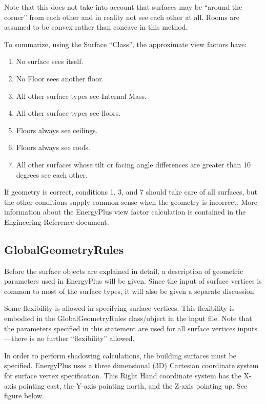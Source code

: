 Note that this does not take into account that surfaces may be ``around the corner'' from each other and in reality not see each other at all. Rooms are assumed to be convex rather than concave in this method.

To summarize, using the Surface ``Class'', the approximate view factors have:

\begin{enumerate}
\item
  No surface sees itself.
\item
  No Floor sees another floor.
\item
  All other surface types see Internal Mass.
\item
  All other surface types see floors.
\item
  Floors always see ceilings.
\item
  Floors always see roofs.
\item
  All other surfaces whose tilt or facing angle differences are greater than 10 degrees see each other.
\end{enumerate}

If geometry is correct, conditions 1, 3, and 7 should take care of all surfaces, but the other conditions supply common sense when the geometry is incorrect. More information about the EnergyPlus view factor calculation is contained in the Engineering Reference document.

\subsection{GlobalGeometryRules}\label{globalgeometryrules}

Before the surface objects are explained in detail, a description of geometric parameters used in EnergyPlus will be given. Since the input of surface vertices is common to most of the surface types, it will also be given a separate discussion.

Some flexibility is allowed in specifying surface vertices. This flexibility is embodied in the GlobalGeometryRules class/object in the input file. Note that the parameters specified in this statement are used for all surface vertices inputs---there is no further ``flexibility'' allowed.

In order to perform shadowing calculations, the building surfaces must be specified. EnergyPlus uses a three dimensional (3D) Cartesian coordinate system for surface vertex specification. This Right Hand coordinate system has the X-axis pointing east, the Y-axis pointing north, and the Z-axis pointing up. See figure below.

